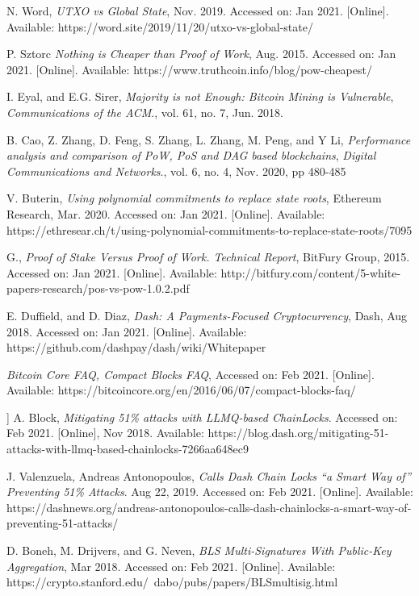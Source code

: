 \documentclass[peerreview]{ieeesyscoin}
\begin{document}
\begin{thebibliography}{00}
 N. Word, \textit{UTXO vs Global State}, Nov. 2019. Accessed on: Jan 2021. [Online]. Available: https://word.site/2019/11/20/utxo-vs-global-state/

 P. Sztorc \textit{Nothing is Cheaper than Proof of Work}, Aug. 2015. Accessed on: Jan 2021. [Online]. Available: https://www.truthcoin.info/blog/pow-cheapest/

 I. Eyal, and E.G. Sirer, \textit{Majority is not Enough: Bitcoin Mining is Vulnerable}, \emph{Communications of the ACM}., vol. 61, no. 7, Jun. 2018.

 B. Cao, Z. Zhang, D. Feng, S. Zhang, L. Zhang, M. Peng, and
Y Li, \textit{Performance analysis and comparison of PoW, PoS and DAG based blockchains}, \emph{Digital Communications and Networks}., vol. 6, no. 4, Nov. 2020, pp 480-485

 V. Buterin, \textit{Using polynomial commitments to replace state roots}, Ethereum Research, Mar. 2020. Accessed on: Jan 2021. [Online]. Available: https://ethresear.ch/t/using-polynomial-commitments-to-replace-state-roots/7095

 G., \textit{Proof of Stake Versus Proof of Work. Technical Report}, BitFury Group, 2015. Accessed on: Jan 2021. [Online]. Available: http://bitfury.com/content/5-white-papers-research/pos-vs-pow-1.0.2.pdf 

 E. Duffield, and D. Diaz, \textit{Dash: A Payments-Focused Cryptocurrency}, Dash, Aug 2018. Accessed on: Jan 2021. [Online]. Available: https://github.com/dashpay/dash/wiki/Whitepaper

 \textit{Bitcoin Core FAQ, Compact Blocks FAQ}, Accessed on: Feb 2021. [Online]. Available: https://bitcoincore.org/en/2016/06/07/compact-blocks-faq/

 ] A. Block, \textit{Mitigating 51\% attacks with LLMQ-based ChainLocks}. Accessed on: Feb 2021. [Online], Nov 2018. Available: https://blog.dash.org/mitigating-51-attacks-with-llmq-based-chainlocks-7266aa648ec9

 J. Valenzuela, Andreas Antonopoulos, \textit{Calls Dash Chain Locks “a Smart Way of” Preventing 51\% Attacks}. Aug 22, 2019. Accessed on: Feb 2021. [Online]. Available: https://dashnews.org/andreas-antonopoulos-calls-dash-chainlocks-a-smart-way-of-preventing-51-attacks/

 D. Boneh, M. Drijvers, and G. Neven, \textit{BLS Multi-Signatures With Public-Key Aggregation}, Mar 2018. Accessed on: Feb 2021. [Online]. Available: https://crypto.stanford.edu/~dabo/pubs/papers/BLSmultisig.html


\end{thebibliography}
\end{document}
